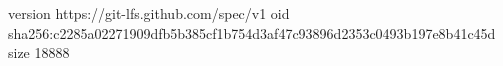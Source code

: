 version https://git-lfs.github.com/spec/v1
oid sha256:c2285a02271909dfb5b385cf1b754d3af47c93896d2353c0493b197e8b41c45d
size 18888
